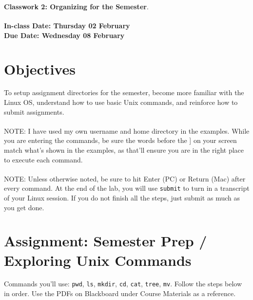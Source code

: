 \documentclass[letter,11pt]{article}
\begin{document}
\huge
\textbf{Classwork 2: Organizing for the Semester}.
\normalsize
\\ ~~ \\
\textbf{In-class Date: Thursday 02 February} \\
\textbf{Due Date: Wednesday 08 February}

\section*{Objectives}
\paragraph{}To setup assignment directories for the semester, become more familiar with the Linux OS, understand how to use basic Unix commands, and reinforce how to submit assignments.
\paragraph{}NOTE: I have used my own username and home directory in the examples. While you are entering the commands, be sure the words before the ] on your screen match what’s shown in the examples, as that’ll ensure you are in the right place to execute each command.
\paragraph{}NOTE: Unless otherwise noted, be sure to hit Enter (PC) or Return (Mac) after every command. At the end of the lab, you will use \texttt{submit} to turn in a transcript of your Linux session. If you do not finish all the steps, just submit as much as you get done.

\section*{Assignment: Semester Prep / Exploring Unix Commands}
\paragraph{}Commands you'll use: \texttt{pwd}, \texttt{ls}, \texttt{mkdir}, \texttt{cd}, \texttt{cat}, \texttt{tree}, \texttt{mv}. Follow the steps below in order. Use the PDFs on Blackboard under Course Materials as a reference.
\end{document}
